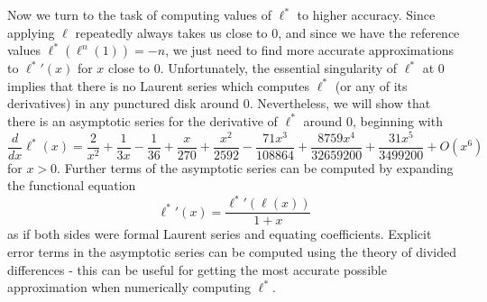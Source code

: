 \documentclass[letterpaper,11pt]{article}
\begin{document}
Now we turn to the task of computing values of $\ell^*$ to higher accuracy. Since applying $\ell$ repeatedly always takes us close to $0$, and since we have the reference values $\ell^*(\ell^n(1)) = -n$, we just need to find more accurate approximations to ${\ell^*}'(x)$ for $x$ close to $0$. Unfortunately, the essential singularity of $\ell^*$ at $0$ implies that there is no Laurent series which computes $\ell^*$ (or any of its derivatives) in any punctured disk around $0$. Nevertheless, we will show that there is an asymptotic series for the derivative of $\ell^*$ around $0$, beginning with
\[
\frac{d}{dx}\ell^*(x) = \frac{2}{x^2} + \frac{1}{3x} - \frac{1}{36} + \frac{x}{270} + \frac{x^2}{2592} - \frac{71x^3}{108864} + \frac{8759x^4}{32659200} + \frac{31x^5}{3499200} + O(x^6)
\]
for $x > 0$. Further terms of the asymptotic series can be computed by expanding the functional equation
\[
{\ell^*}'(x) = \frac{{\ell^*}'(\ell(x))}{1+x}
\]
as if both sides were formal Laurent series and equating coefficients. Explicit error terms in the asymptotic series can be computed using the theory of divided differences - this can be useful for getting the most accurate possible approximation when numerically computing $\ell^*$.
\begin{comment}
continued fraction attempt number one:
\[
\frac{d}{dx}\ell^*(x) = \frac{2}{x^2 - \frac{x^3}{6 + \frac{3x}{2 + \frac{x}{30 - \frac{18x}{1 + \frac{236x}{189 - \frac{17585x}{472 + \frac{389763x}{3517}}}}}}}}
\]
\end{comment}
\end{document}
